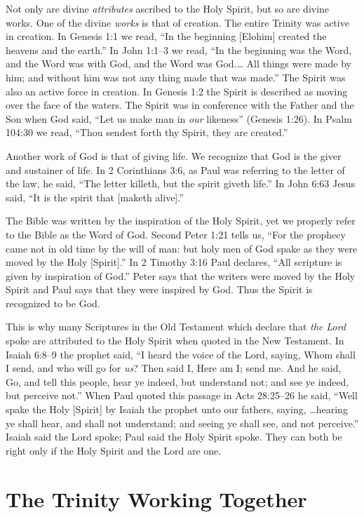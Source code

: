 Not only are divine \emph{attributes} ascribed to the Holy Spirit,
but so are divine works. One of the divine \emph{works} is that of
creation. The entire Trinity was active in creation. In Genesis
1:1 we read, “In the beginning [Elohim] created the heavens
and the earth.” In John 1:1–3 we read, “In the beginning was
the Word, and the Word was with God, and the Word was
God.… All things were made by him; and without him was
not any thing made that was made.” The Spirit was also an
active force in creation. In Genesis 1:2 the Spirit is described
as moving over the face of the waters. The Spirit was in conference
with the Father and the Son when God said, “Let us
make man in \emph{our} likeness” (Genesis 1:26). In Psalm 104:30
we read, “Thou sendest forth thy Spirit, they are created.”

Another work of God is that of giving life. We recognize
that God is the giver and sustainer of life. In 2 Corinthians
3:6, as Paul was referring to the letter of the law, he said,
“The letter killeth, but the spirit giveth life.” In John 6:63
Jesus said, “It is the spirit that [maketh alive].”

The Bible was written by the inspiration of the Holy
Spirit, yet we properly refer to the Bible as the Word of God.
Second Peter 1:21 tells us, “For the prophecy came not in
old time by the will of man: but holy men of God spake as
they were moved by the Holy [Spirit].” In 2 Timothy 3:16
Paul declares, “All scripture is given by inspiration of God.”
Peter says that the writers were moved by the Holy Spirit
and Paul says that they were inspired by God. Thus the
Spirit is recognized to be God.

This is why many Scriptures in the Old Testament which
declare that \emph{the Lord} spoke are attributed to the Holy Spirit
when quoted in the New Testament. In Isaiah 6:8–9 the
prophet said, “I heard the voice of the Lord, saying, Whom
shall I send, and who will go for \emph{us}? Then said I, Here am
I; send me. And he said, Go, and tell this people, hear ye
indeed, but understand not; and see ye indeed, but perceive
not.” When Paul quoted this passage in Acts 28:25–26 he
said, “Well spake the Holy [Spirit] by Isaiah the prophet
unto our fathers, saying, …hearing ye shall hear, and shall
not understand; and seeing ye shall see, and not perceive.”
Isaiah said the Lord spoke; Paul said the Holy Spirit spoke.
They can both be right only if the Holy Spirit and the Lord
are one.


\section*{The Trinity Working Together}

